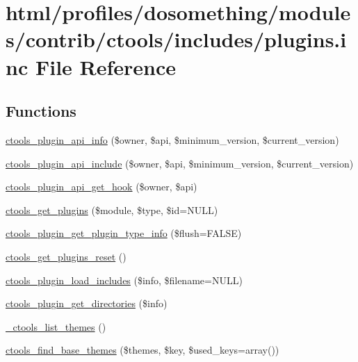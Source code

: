 \hypertarget{ctools_2includes_2plugins_8inc}{
\section{html/profiles/dosomething/modules/contrib/ctools/includes/plugins.inc File Reference}
\label{ctools_2includes_2plugins_8inc}
}
\subsection*{Functions}
\begin{DoxyCompactItemize}
\item 
\hyperlink{ctools_2includes_2plugins_8inc_a68730edda9e1d2a3e90da8c4149cab43}{ctools\_\-plugin\_\-api\_\-info} (\$owner, \$api, \$minimum\_\-version, \$current\_\-version)
\item 
\hyperlink{ctools_2includes_2plugins_8inc_acf1dd0bc77f5805d03dda03e32526ba9}{ctools\_\-plugin\_\-api\_\-include} (\$owner, \$api, \$minimum\_\-version, \$current\_\-version)
\item 
\hyperlink{ctools_2includes_2plugins_8inc_a7211172b4adf55371fb7881bbb74c353}{ctools\_\-plugin\_\-api\_\-get\_\-hook} (\$owner, \$api)
\item 
\hyperlink{ctools_2includes_2plugins_8inc_aad93a9aa7b585e33d6696ac0b9ec42fc}{ctools\_\-get\_\-plugins} (\$module, \$type, \$id=NULL)
\item 
\hyperlink{ctools_2includes_2plugins_8inc_a33425fdf7b78f6c83c9dcb3dc550e2c3}{ctools\_\-plugin\_\-get\_\-plugin\_\-type\_\-info} (\$flush=FALSE)
\item 
\hyperlink{ctools_2includes_2plugins_8inc_a9af4fc3f7a11693d67599827eaac90a2}{ctools\_\-get\_\-plugins\_\-reset} ()
\item 
\hyperlink{ctools_2includes_2plugins_8inc_a0aef65ab6f4cc9910d50e558ae31893a}{ctools\_\-plugin\_\-load\_\-includes} (\$info, \$filename=NULL)
\item 
\hyperlink{ctools_2includes_2plugins_8inc_a6f8865ad642e7d820c82c7862f733157}{ctools\_\-plugin\_\-get\_\-directories} (\$info)
\item 
\hyperlink{ctools_2includes_2plugins_8inc_ae5c72cfffee3e4bb17c0d94ad9ba65a9}{\_\-ctools\_\-list\_\-themes} ()
\item 
\hyperlink{ctools_2includes_2plugins_8inc_a54ce9c42d2bdffee037746dfd46261a7}{ctools\_\-find\_\-base\_\-themes} (\$themes, \$key, \$used\_\-keys=array())

\end{DoxyCompactItemize}
